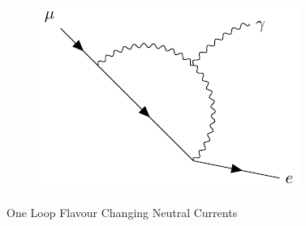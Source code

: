\documentclass[a4paper, 11pt, normalem]{report}
\begin{document}
\begin{figure}[H]
\begin{subfigure}[b]{0.3\textwidth}
        \caption{}
    \end{subfigure}
    \begin{subfigure}[b]{0.3\textwidth}
        \centering
        \includegraphics[width=\textwidth]{fcnc3.pdf}
        \caption{}
    \end{subfigure}
    \caption{One Loop Flavour Changing Neutral Currents}
\end{figure}
\end{document}
